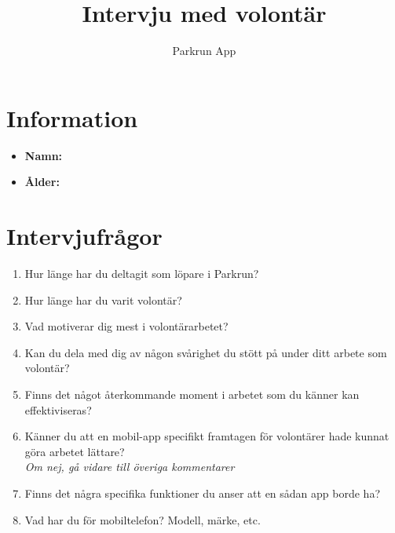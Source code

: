 \documentclass{article}
\title{\textbf{Intervju med volontär}}
\author{Parkrun App}
\date{}
\begin{document}
\maketitle
\thispagestyle{empty}
\section*{Information}
\begin{itemize}[label=]
    \item \textbf{Namn:} 
    \item \textbf{Ålder:} 
\end{itemize}

\section*{Intervjufrågor}
\begin{enumerate}[label=\textbf{Fråga \arabic*:}]
    \item Hur länge har du deltagit som löpare i Parkrun?
        \vspace{2cm}
    \item Hur länge har du varit volontär?
        \vspace{2cm}
    \item Vad motiverar dig mest i volontärarbetet?
        \vspace{2cm}
    \item Kan du dela med dig av någon svårighet du stött på under ditt arbete som volontär?
        \vspace{2cm}
    \item Finns det något återkommande moment i arbetet som du känner kan effektiviseras?
        \vspace{2cm}
    \item Känner du att en mobil-app specifikt framtagen för volontärer hade kunnat göra arbetet lättare?\\
    \textit{Om nej, gå vidare till överiga kommentarer}
        \vspace{2cm}
    \item Finns det några specifika funktioner du anser att en sådan app borde ha?
        \vspace{2cm}
    \item Vad har du för mobiltelefon? Modell, märke, etc.
        \vspace{2cm}
\end{enumerate}
\thispagestyle{empty}
\newpage
\end{document}
